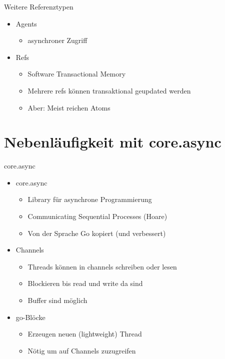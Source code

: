 \documentclass[presentation]{beamer}
\begin{document}
\begin{frame}{Weitere Referenztypen}
  \begin{itemize}
  \item Agents
    \begin{itemize}
    \item asynchroner Zugriff
    \end{itemize}
  \item Refs
    \begin{itemize}
    \item Software Transactional Memory
    \item Mehrere refs können transaktional geupdated werden
    \item Aber: Meist reichen Atoms
    \end{itemize}
  \end{itemize}
\end{frame}

\section{Nebenläufigkeit mit core.async}

\begin{frame}{core.async}
  \begin{itemize}
  \item core.async
    \begin{itemize}
    \item Library für asynchrone Programmierung
    \item Communicating Sequential Processes (Hoare)
    \item Von der Sprache Go kopiert (und verbessert)
    \end{itemize}
  \item Channels
    \begin{itemize}
    \item Threads können in channels schreiben oder lesen
    \item Blockieren bis read und write da sind
    \item Buffer sind möglich
    \end{itemize}
  \item go-Blöcke
    \begin{itemize}
    \item Erzeugen neuen (lightweight) Thread
    \item Nötig um auf Channels zuzugreifen
    \end{itemize}
  \end{itemize}
\end{frame}
\end{document}
